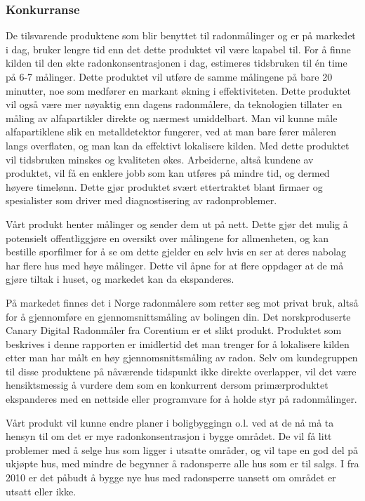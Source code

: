 \subsubsection{Konkurranse}
De tilsvarende produktene som blir benyttet til radonmålinger og er på markedet i dag, bruker lengre tid enn det dette produktet vil være kapabel til. For å finne kilden til den økte radonkonsentrasjonen i dag, estimeres tidsbruken til én time på 6-7 målinger. Dette produktet vil utføre de samme målingene på bare 20 minutter, noe som medfører en markant økning i effektiviteten. Dette produktet vil også være mer nøyaktig enn dagens radonmålere, da teknologien tillater en måling av alfapartikler direkte og nærmest umiddelbart. Man vil kunne måle alfapartiklene slik en metalldetektor fungerer, ved at man bare fører måleren langs overflaten, og man kan da effektivt lokalisere kilden. Med dette produktet vil tidsbruken minskes og kvaliteten økes. Arbeiderne, altså kundene av produktet, vil få en enklere jobb som kan utføres på mindre tid, og dermed høyere timelønn. Dette gjør produktet svært ettertraktet blant firmaer og spesialister som driver med diagnostisering av radonproblemer.

Vårt produkt henter målinger og sender dem ut på nett. Dette gjør det mulig å potensielt offentliggjøre en oversikt over målingene for allmenheten, og kan bestille sporfilmer for å se om dette gjelder en selv hvis en ser at deres nabolag har flere hus med høye målinger. Dette vil åpne for at flere oppdager at de må gjøre tiltak i huset, og markedet kan da ekspanderes.

På markedet finnes det i Norge radonmålere som retter seg mot privat bruk, altså for å gjennomføre en gjennomsnittsmåling av bolingen din. Det norskproduserte Canary Digital Radonmåler fra Corentium er et slikt produkt. Produktet som beskrives i denne rapporten er imidlertid det man trenger for å lokalisere kilden etter man har målt en høy gjennomsnittsmåling av radon. Selv om kundegruppen til disse produktene på nåværende tidspunkt ikke direkte overlapper, vil det være hensiktsmessig å vurdere dem som en konkurrent dersom primærproduktet ekspanderes med en nettside eller programvare for å holde styr på radonmålinger.

Vårt produkt vil kunne endre planer i boligbyggingn o.l. ved at de nå må ta hensyn til om det er mye radonkonsentrasjon
i bygge området. De vil få litt problemer med å selge hus som ligger i utsatte områder, og vil tape en god del på
ukjøpte hus, med mindre de begynner å radonsperre alle hus som er til salgs. I fra 2010 er det påbudt å bygge nye 
hus med radonsperre uansett om området er utsatt eller ikke.